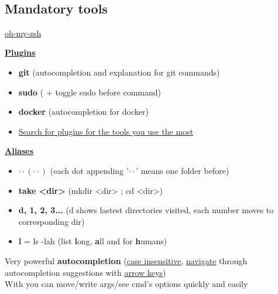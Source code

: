 \documentclass[10pt,a4paper]{article}
\title{ }
\date{}
\begin{document}

\small
\begin{multicols}{3}

\thispagestyle{empty}
\scriptsize


\section{Mandatory tools}




\begin{textbox}{\href{https://ohmyz.sh/}{oh-my-zsh}}

\underline{\textbf{Plugins}}
\begin{itemize}
    \item \textbf{git} (autocompletion and explanation for git commands)
    \item \textbf{sudo} (  +  toggle sudo before command)
    \item \textbf{docker} (autocompletion for docker)
    \item \href{https://github.com/ohmyzsh/ohmyzsh/wiki/Plugins}{Search for plugins for the tools you use the most} 
\end{itemize}

\underline{\textbf{Aliases}}
\begin{itemize}
    \item \textbf{$\cdot\cdot(\cdot\cdot)$ } (each dot appending '$\cdot\cdot$' means one folder before)
    \item \textbf{take <dir>} (mkdir <dir> ; cd <dir>)
    \item \textbf{d, 1, 2, 3...} (d shows lastest directories visited, each number moves to corresponding dir)
    \item \textbf{l} = ls -lah (list \textbf{l}ong, \textbf{a}ll and for \textbf{h}umans)
\end{itemize}


Very powerful \textbf{autocompletion} (\underline{case insensitive},  \underline{navigate} through autocompletion suggestions with \underline{arrow keys})\\

With  you can move/write args/see cmd's options quickly and easily\\


\end{textbox}
\end{multicols}
\end{document}

